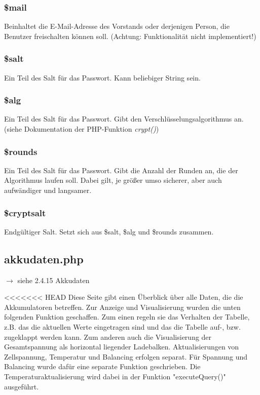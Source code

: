\documentclass[fontsize = 12pt, paper = a4]{scrreprt}
\begin{document}
\subsubsection*{\$mail}
Beinhaltet die E-Mail-Adresse des Vorstands oder derjenigen Person, die Benutzer freischalten können soll. (Achtung: Funktionalität nicht implementiert!)
\subsubsection*{\$salt}
Ein Teil des Salt für das Passwort. Kann beliebiger String sein.
\subsubsection*{\$alg}
Ein Teil des Salt für das Passwort. Gibt den Verschlüsselungsalgorithmus an. (siehe Dokumentation der PHP-Funktion \textit{crypt()})
\subsubsection*{\$rounds}
Ein Teil des Salt für das Passwort. Gibt die Anzahl der Runden an, die der Algorithmus laufen soll. Dabei gilt, je größer umso sicherer, aber auch aufwändiger und langsamer.
\subsubsection*{\$cryptsalt}
Endgültiger Salt. Setzt sich aus \$salt, \$alg und \$rounds zusammen.

\newpage




\subsection{akkudaten.php}
$\rightarrow$ siehe 2.4.15 Akkudaten

<<<<<<< HEAD
Diese Seite gibt einen Überblick über alle Daten, die die Akkumulatoren betreffen. Zur Anzeige und Visualisierung wurden die unten folgenden Funktion geschaffen. Zum einen regeln sie das Verhalten der Tabelle, z.B. das die aktuellen Werte eingetragen sind und das die Tabelle auf-, bzw. zugeklappt werden kann. Zum anderen auch die Visualisierung der Gesamtspannung als horizontal liegender Ladebalken. Aktualisierungen von Zellspannung, Temperatur und Balancing erfolgen separat. Für Spannung und Balancing wurde dafür eine separate Funktion geschrieben. Die Temperaturaktualisierung wird dabei in der Funktion "executeQuery()" ausgeführt.\\
\end{document}
